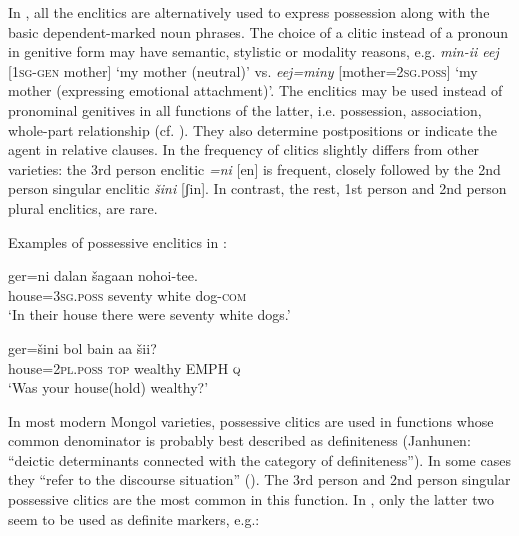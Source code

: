 \documentclass[output=paper,colorlinks,citecolor=brown]{langscibook}
\begin{document}
\begin{sloppypar}
In , all the enclitics are alternatively used to express possession along with the basic dependent-marked noun phrases. The choice of a clitic instead of a pronoun in genitive form may have semantic, stylistic or modality reasons, e.g. \textit{min-ii eej} [1\textsc{sg-gen} mother] ‘my mother (neutral)’ vs. \textit{eej=miny} [mother=2\textsc{sg.poss}] ‘my mother (expressing emotional attachment)’. The enclitics may be used instead of pronominal genitives in all functions of the latter, i.e. possession, association, whole-part relationship (cf. \citealt[262]{Dixon2010b}). They also determine postpositions or indicate the agent in relative clauses.
In  the frequency of clitics slightly differs from other  varieties: the 3rd person enclitic\textit{ =ni} [en] is frequent, closely followed by the 2nd person singular enclitic \textit{šini} [ʃin]. In contrast, the rest, 1st person and 2nd person plural enclitics, are rare.
\end{sloppypar}

Examples of possessive enclitics in :

\ea
    \label{example9.21}
    \gll ger=ni 		dalan 		šagaan 	nohoi-tee.\\
    house=3\textsc{sg.poss} 	seventy 	white 		dog-\textsc{com}\\
    \glt `In their house there were seventy white dogs.'\\
    \z

\ea
    \label{example9.22}
    \gll ger=šini 	  	bol 	bain 		aa 	šii?\\
    house=2\textsc{pl.poss} 	\textsc{top}	wealthy	EMPH \textsc{q}\\
    \glt `Was your house(hold) wealthy?'\\
    \z

\begin{sloppypar}
In most modern Mongol varieties, possessive clitics are used in functions whose common denominator is probably best described as definiteness (Janhunen: “deictic determinants connected with the category of definiteness”). In some cases they “refer to the discourse situation” (\citealt[93]{Janhunen2003b}).  The 3rd person and 2nd person singular possessive clitics are the most common in this function. In , only the latter two seem to be used as definite markers, e.g.:
\end{sloppypar}
\end{document}
